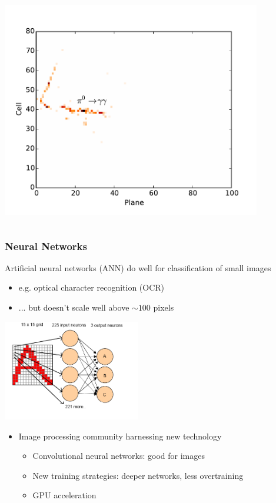\documentclass[10pt,professionalfonts,xcolor=table]{beamer}
\begin{document}
\begin{frame}
\begin{columns}[b]
\vspace{-5pt}


\includegraphics[width=0.85\textwidth]{figures/cnn/view_truetype13_caltype6_event144_x.pdf}

\end{columns}
\end{frame}


\begin{frame}
\frametitle{Neural Networks}
  \begin{itemize}
  \bang Artificial neural networks (ANN) do well for classification of small images
    \begin{itemize}
    \item e.g. optical character recognition (OCR)
    \item[] ... but doesn't scale well above $\sim 100$ pixels
    \end{itemize}
  \end{itemize}
\begin{center}
  \includegraphics[width=0.45\textwidth]{figures/figures/ocr_ann.png}
\end{center}

  \begin{itemize}
  \item Image processing community harnessing new technology
    \begin{itemize}
    \item Convolutional neural networks: good for images
    \item New training strategies: deeper networks, less overtraining
    \item GPU acceleration
    \end{itemize}
  \end{itemize}

\end{frame}
\end{document}
